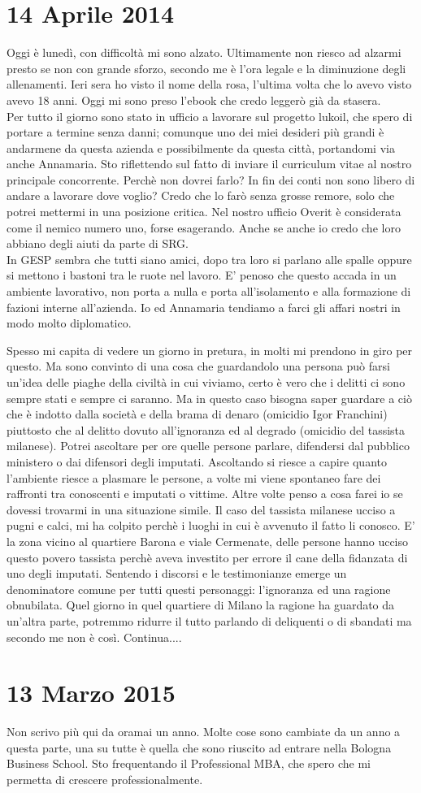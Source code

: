 \section{14 Aprile 2014}
Oggi è lunedì, con difficoltà mi sono alzato. Ultimamente non riesco ad alzarmi presto se non con grande sforzo, secondo me è l'ora legale e la diminuzione degli allenamenti. Ieri sera ho visto il nome della rosa, l'ultima volta che lo avevo visto avevo 18 anni. Oggi mi sono preso l'ebook che credo leggerò già da stasera.\\
Per tutto il giorno sono stato in ufficio a lavorare sul progetto lukoil, che spero di portare a termine senza danni;
 comunque uno dei miei desideri più grandi è andarmene da questa azienda e possibilmente da questa città, portandomi via anche Annamaria. Sto riflettendo sul fatto di inviare il curriculum vitae al nostro principale concorrente. Perchè non dovrei farlo? In fin dei conti non sono libero di andare a lavorare dove voglio? Credo che lo farò senza grosse remore, solo che potrei mettermi in una posizione critica. Nel nostro ufficio Overit è considerata come il nemico numero uno, forse esagerando. Anche se anche io credo che loro abbiano degli aiuti da parte di SRG.\\
In GESP sembra che tutti siano amici, dopo tra loro si parlano alle spalle oppure si mettono i bastoni tra le ruote nel lavoro. E' penoso che questo accada in un ambiente lavorativo, non porta a nulla e porta all'isolamento e alla formazione di fazioni interne all'azienda. Io ed Annamaria tendiamo a farci gli affari nostri in modo molto diplomatico.\par
Spesso mi capita di vedere un giorno in pretura, in molti mi prendono in giro per questo. Ma sono convinto di una cosa che guardandolo una persona può farsi un'idea delle piaghe della civiltà in cui viviamo, certo è vero che i delitti ci sono sempre stati e sempre ci saranno. Ma in questo caso bisogna saper guardare a ciò che è indotto dalla società e della brama di denaro (omicidio Igor Franchini) piuttosto che al delitto dovuto all'ignoranza ed al degrado (omicidio del tassista milanese). Potrei ascoltare per ore quelle persone parlare, difendersi dal pubblico ministero o dai difensori degli imputati. Ascoltando si riesce a capire quanto l'ambiente riesce a plasmare le persone, a volte mi viene spontaneo fare dei raffronti tra conoscenti e imputati o vittime. Altre volte penso a cosa farei io se dovessi trovarmi in una situazione simile. Il caso del tassista milanese ucciso a pugni e calci, mi ha colpito perchè i luoghi in cui è avvenuto il fatto li conosco. E' la zona vicino al quartiere Barona e viale Cermenate, delle persone hanno ucciso questo povero tassista perchè aveva investito per errore il cane della fidanzata di uno degli imputati. Sentendo i discorsi e le testimonianze emerge un denominatore comune per tutti questi personaggi: l'ignoranza ed una ragione obnubilata. Quel giorno in quel quartiere di Milano la ragione ha guardato da un'altra parte, potremmo ridurre il tutto parlando di deliquenti o di sbandati ma secondo me non è così. Continua....

\section{13 Marzo 2015}
Non scrivo più qui da oramai un anno. Molte cose sono cambiate da un anno a questa parte, una su tutte è quella che sono riuscito ad entrare nella Bologna Business School. Sto frequentando il Professional MBA, che spero che mi permetta di crescere professionalmente.